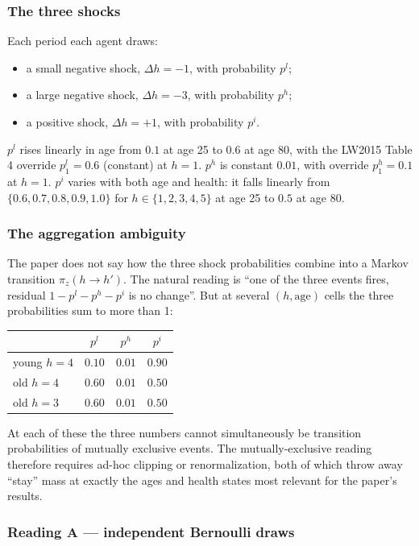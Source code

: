 \subsubsection{The three shocks}

Each period each agent draws:
\begin{itemize}
 \item a small negative shock, $\Delta h = -1$, with probability $p^l$;
 \item a large negative shock, $\Delta h = -3$, with probability $p^h$;
 \item a positive shock, $\Delta h = +1$, with probability $p^i$.
\end{itemize}
$p^l$ rises linearly in age from $0.1$ at age 25 to $0.6$ at age 80, with the LW2015 Table 4 override $p^l_1 = 0.6$ (constant) at $h=1$. $p^h$ is constant $0.01$, with override $p^h_1 = 0.1$ at $h=1$. $p^i$ varies with both age and health: it falls linearly from $\{0.6, 0.7, 0.8, 0.9, 1.0\}$ for $h \in \{1, 2, 3, 4, 5\}$ at age 25 to $0.5$ at age 80.

\subsubsection{The aggregation ambiguity}

The paper does not say how the three shock probabilities combine into a Markov transition $\pi_z(h \to h')$. The natural reading is ``one of the three events fires, residual $1 - p^l - p^h - p^i$ is no change''. But at several $(h, \text{age})$ cells the three probabilities sum to more than 1:
\begin{center}
\begin{tabular}{lccc}
 & $p^l$ & $p^h$ & $p^i$ \\
\hline
young $h=4$ & $0.10$ & $0.01$ & $0.90$ \\
old $h=4$   & $0.60$ & $0.01$ & $0.50$ \\
old $h=3$   & $0.60$ & $0.01$ & $0.50$
\end{tabular}
\end{center}
At each of these the three numbers cannot simultaneously be transition probabilities of mutually exclusive events. The mutually-exclusive reading therefore requires ad-hoc clipping or renormalization, both of which throw away ``stay'' mass at exactly the ages and health states most relevant for the paper's results.

\subsubsection{Reading A --- independent Bernoulli draws}

